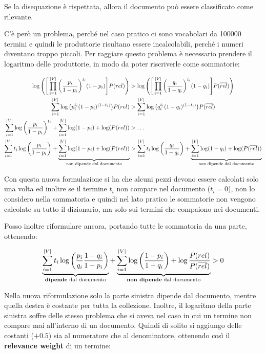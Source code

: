 \noindent Se la disequazione è rispettata, allora il documento può essere classificato come rilevante.

C'è però un problema, perché nel caso pratico ci sono vocabolari da 100000 termini e quindi le produttorie risultano essere incalcolabili, perché i numeri diventano troppo piccoli.
Per raggiare questo problema è necessario prendere il logaritmo delle produttorie, in modo da poter riscriverle come sommatorie:

\begin{align*}
\log \Bigg(\Bigg[\prod\limits_{i=1}^{|V|} \bigg(\frac{ p_{i} }{1-p_i}\bigg)^{t_i} (1-p_i)\Bigg] P(rel)\Bigg) &>\log\Bigg(\Bigg[\prod\limits_{i=1}^{|V|} \bigg(\frac{ q_{i} }{1-q_i}\bigg)^{t_i} (1-q_i)\Bigg] P(\overline{rel})\Bigg) \\
\sum\limits_{i=1}^{|V|} \log\big( p_{i}^{t_i} (1 - p_{i})^{(1-t_i)} \big) P(rel) &> \sum\limits_{i=1}^{|V|} \log\big( q_{i}^{t_i} (1 - q_{i})^{(1-t_i)} \big) P(\overline{rel}) \\
\sum\limits_{i=1}^{|V|} \log\bigg( \frac{ p_{i} }{1-p_i} \bigg)^{t_i} +\sum\limits_{i=1}^{|V|} \log(1-p_i) + \log(P(rel)) &> \ldots \\
\sum\limits_{i=1}^{|V|} t_i \log\bigg( \frac{ p_{i} }{1-p_i} \bigg) + \underbrace{\sum\limits_{i=1}^{|V|} \log(1-p_i) + \log(P(rel))}_{\text{non dipende dal documento}} &> \sum\limits_{i=1}^{|V|} t_i \log\bigg( \frac{ q_{i} }{1-q_i} \bigg) +\underbrace{\sum\limits_{i=1}^{|V|} \log(1-q_i) + \log(P(\overline{rel}))}_{\text{non dipende dal documento}}
\end{align*}

\noindent Con questa nuova formulazione si ha che alcuni pezzi devono essere calcolati solo una volta ed inoltre se il termine $t_i$ non compare nel documento ($t_i=0$), non lo considero nella sommatoria e quindi nel lato pratico le sommatorie non vengono calcolate su tutto il dizionario, ma solo sui termini che compaiono nei documenti.

Posso inoltre riformulare ancora, portando tutte le sommatoria da una parte, ottenendo:

$$
\underbrace{\sum\limits_{i=1}^{|V|} t_i \log\bigg( \frac{p_i}{q_i} \frac{1-q_i}{1-p_i}\bigg)}_{\text{\textbf{dipende} dal documento}} + \underbrace{\sum\limits_{i=1}^{|V|} \log \bigg( \frac{1-p_i}{1-q_i} \bigg) + \log \frac{P(rel)}{P(\overline{rel})}}_{\text{\textbf{non dipende} dal documento}} > 0
$$

\noindent Nella nuova riformulazione solo la parte sinistra dipende dal documento, mentre quella destra è costante per tutta la collezione.
Inoltre, il logaritmo della parte sinistra soffre delle stesso problema che si aveva nel caso in cui un termine non compare mai all'interno di un documento.
Quindi di solito si aggiungo delle costanti ($+0.5$) sia al numeratore che al denominatore, ottenendo così il \textbf{relevance weight} di un termine:

